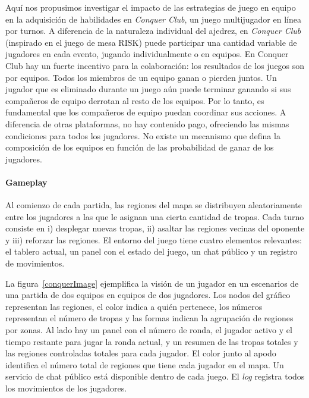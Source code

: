 \documentclass[a4paper,11pt]{book}
\theoremstyle{definition}
\begin{document}
Aqu\'i nos propusimos investigar el impacto de las estrategias de juego en equipo en la adquisici\'on de habilidades en \emph{Conquer Club}, un juego multijugador en l\'inea por turnos.
%
A diferencia de la naturaleza individual del ajedrez, en \emph{Conquer Club} (inspirado en el juego de mesa RISK) puede participar una cantidad variable de jugadores en cada evento, jugando individualmente o en equipos.
%
En Conquer Club hay un fuerte incentivo para la colaboraci\'on: los resultados de los juegos son por equipos.
%
Todos los miembros de un equipo ganan o pierden juntos.
%
Un jugador que es eliminado durante un juego a\'un puede terminar ganando si sus compa\~neros de equipo derrotan al resto de los equipos.
%
Por lo tanto, es fundamental que los compa\~neros de equipo puedan coordinar sus acciones.
%
A diferencia de otras plataformas, no hay contenido pago, ofreciendo las mismas condiciones para todos los jugadores.
%
No existe un mecanismo que defina la composici\'on de los equipos en funci\'on de las probabilidad de ganar de los jugadores.
%

\paragraph{Gameplay}\label{sub:gameplay}

Al comienzo de cada partida, las regiones del mapa se distribuyen aleatoriamente entre los jugadores a las que le asignan una cierta cantidad de tropas.
%
Cada turno consiste en i) desplegar nuevas tropas, ii) asaltar las regiones vecinas del oponente y iii) reforzar las regiones.
%
El entorno del juego tiene cuatro elementos relevantes: el tablero actual, un panel con el estado del juego, un chat p\'ublico y un registro de movimientos.


La figura~\ref{conquerImage} ejemplifica la visi\'on de un jugador en un escenarios de una partida de dos equipos en equipos de dos jugadores.
%
Los nodos del gr\'afico representan las regiones, el color indica a qui\'en pertenece, los n\'umeros representan el n\'umero de tropas y las formas indican la agrupaci\'on de regiones por zonas.
%
Al lado hay un panel con el n\'umero de ronda, el jugador activo y el tiempo restante para jugar la ronda actual, y un resumen de las tropas totales y las regiones controladas totales para cada jugador.
%
El color junto al apodo identifica el n\'umero total de regiones que tiene cada jugador en el mapa.
%
Un servicio de chat p\'ublico est\'a disponible dentro de cada juego.
%
El \emph{log} registra todos los movimientos de los jugadores.
\end{document}
